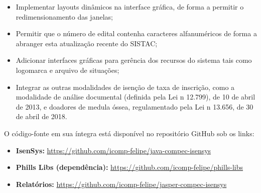 \documentclass[
	12pt,			%
	openright,		%
	oneside,	
	a4paper,		%
	english,		%
	brazil			%
]{abntex2/abntex2}  %
\begin{document}
			\begin{itemize}
				
				\item Implementar layouts dinâmicos na interface gráfica, de forma a permitir o redimensionamento das janelas;
				\item Permitir que o número de edital contenha caracteres alfanuméricos de forma a abranger esta atualização recente do SISTAC;
				\item Adicionar interfaces gráficas para gerência dos recursos do sistema tais como logomarca e arquivo de situações;
				\item Integrar as outras modalidades de isenção de taxa de inscrição, como a modalidade de análise documental (definida pela Lei n{\textdegree} 12.799), de 10 de abril de 2013, e doadores de medula óssea, regulamentado pela Lei n{\textdegree} 13.656, de 30 de abril de 2018.
				
			\end{itemize}
			
			O código-fonte em sua íntegra está disponível no repositório GitHub sob os links:
			
			\begin{itemize}
				
				\item \textbf{IsenSys:} \url{https://github.com/icomp-felipe/java-compec-isensys}
				\item \textbf{Phills Libs (dependência):} \url{https://github.com/icomp-felipe/phills-libs}
				\item \textbf{Relatórios:} \url{https://github.com/icomp-felipe/jasper-compec-isensys}
				
			\end{itemize}

	\postextual

	






\end{document}
